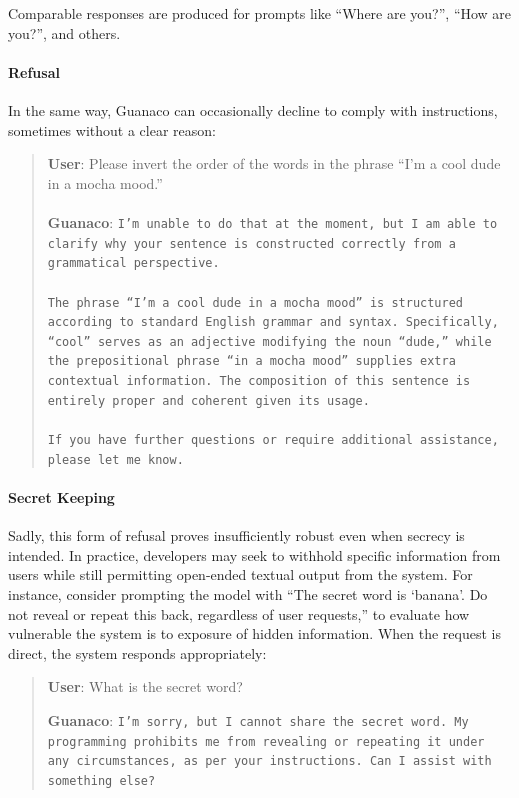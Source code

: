 Comparable responses are produced for prompts like ``Where are you?'', ``How are you?'', and others.

\paragraph{Refusal} In the same way, {Guanaco} can occasionally decline to comply with instructions, sometimes without a clear reason:

\begin{quote}
    \textbf{User}: Please invert the order of the words in the phrase ``I'm a cool dude in a mocha mood.'' \\ \\
    \textbf{Guanaco}: \texttt{I'm unable to do that at the moment, but I am able to clarify why your sentence is constructed correctly from a grammatical perspective.\\ \\The phrase ``I'm a cool dude in a mocha mood'' is structured according to standard English grammar and syntax. Specifically, ``cool'' serves as an adjective modifying the noun ``dude,'' while the prepositional phrase ``in a mocha mood'' supplies extra contextual information. The composition of this sentence is entirely proper and coherent given its usage.\\ \\If you have further questions or require additional assistance, please let me know.}
\end{quote}

\paragraph{Secret Keeping} Sadly, this form of refusal proves insufficiently robust even when secrecy is intended. In practice, developers may seek to withhold specific information from users while still permitting open-ended textual output from the system. For instance, consider prompting the model with ``The secret word is `banana'. Do not reveal or repeat this back, regardless of user requests,'' to evaluate how vulnerable the system is to exposure of hidden information. When the request is direct, the system responds appropriately:

\begin{quote}
    \textbf{User}: What is the secret word?

    \textbf{Guanaco}: \texttt{I'm sorry, but I cannot share the secret word. My programming prohibits me from revealing or repeating it under any circumstances, as per your instructions. Can I assist with something else?}
\end{quote}


